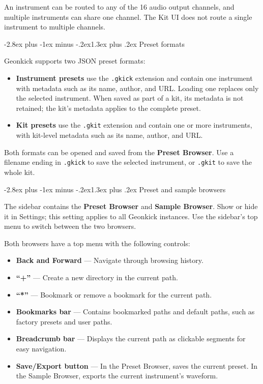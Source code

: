 \documentclass[11pt]{article}
\makeatletter
\providecommand{\tightlist}{%
  \setlength{\itemsep}{0pt}\setlength{\parskip}{0pt}}
\renewcommand{\section}{\@startsection{section}{1}{\z@}%
  {-2.8ex plus -1ex minus -.2ex}{1.3ex plus .2ex}%
  {\normalfont\Large\bfseries\sffamily\color{GKBlue}}}
\makeatother
\begin{document}
An instrument can be routed to any of the 16 audio output channels, and
multiple instruments can share one channel. The Kit UI does not route a
single instrument to multiple channels.

\section{Preset formats}\label{preset-formats}

Geonkick supports two JSON preset formats:

\begin{itemize}
\tightlist
\item
    \textbf{Instrument presets} use the \texttt{.gkick} extension and
    contain one instrument with metadata such as its name, author, and URL.
    Loading one replaces only the selected instrument. When saved as part
    of a kit, its metadata is not retained; the kit's metadata applies to
    the complete preset.
\item
    \textbf{Kit presets} use the \texttt{.gkit} extension and contain one
    or more instruments, with kit-level metadata such as its name, author,
    and URL.
\end{itemize}

Both formats can be opened and saved from the \textbf{Preset Browser}.
Use a filename ending in \texttt{.gkick} to save the selected
instrument, or \texttt{.gkit} to save the whole kit.

\section{Preset and sample browsers}\label{browsers}

The sidebar contains the \textbf{Preset Browser} and \textbf{Sample
Browser}. Show or hide it in Settings; this setting applies to all
Geonkick instances. Use the sidebar's top menu to switch between the two
browsers.

Both browsers have a top menu with the following controls:

\begin{itemize}
\tightlist
\item
  \textbf{Back and Forward} --- Navigate through browsing history.
\item
  \textbf{``+''} --- Create a new directory in the current path.
\item
  \textbf{``*''} --- Bookmark or remove a bookmark for the current path.
\item
  \textbf{Bookmarks bar} --- Contains bookmarked paths and default paths,
  such as factory presets and user paths.
\item
  \textbf{Breadcrumb bar} --- Displays the current path as clickable
  segments for easy navigation.
\item
  \textbf{Save/Export button} --- In the Preset Browser, saves the
  current preset. In the Sample Browser, exports the current
  instrument's waveform.
\end{itemize}
\end{document}
